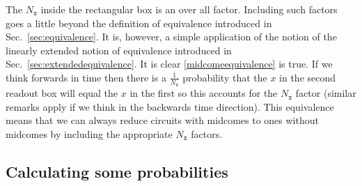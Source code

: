\documentclass[10pt]{article}
\begin{document}
The $N_\mathtt{x}$ inside the rectangular box is an over all factor.  Including such factors goes a little beyond the definition of equivalence introduced in Sec.\ \ref{sec:equivalence}.  It is, however, a simple application of the notion of the linearly extended notion of equivalence introduced in Sec.\ \ref{sec:extendedequivalence}.    It is clear \eqref{midcomeequivalence} is true.  If we think forwards in time then there is a $\frac{1}{N_\mathtt{x}}$ probability that the $x$ in the second readout box will equal the $x$ in the first so this accounts for the $N_\mathtt{x}$ factor (similar remarks apply if we think in the backwards time direction).   This equivalence means that we can always reduce circuits with midcomes to ones without midcomes by including the appropriate $N_\mathtt{x}$ factors.



\subsection{Calculating some probabilities}
\end{document}
